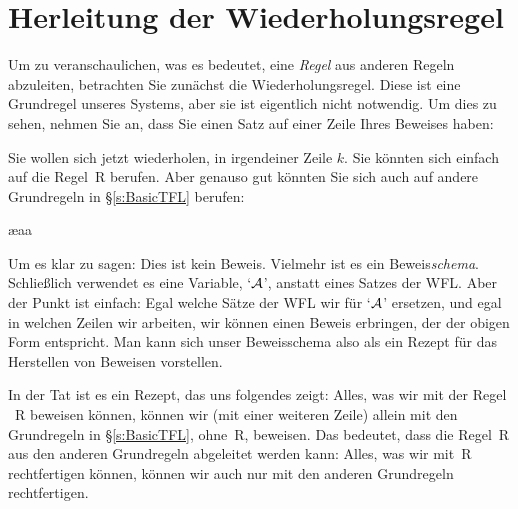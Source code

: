 \section{Herleitung der Wiederholungsregel}
Um zu veranschaulichen, was es bedeutet, eine \emph{Regel} aus anderen Regeln abzuleiten, betrachten Sie zunächst die Wiederholungsregel. Diese ist eine Grundregel unseres Systems, aber sie ist eigentlich nicht notwendig. Um dies zu sehen, nehmen Sie an, dass Sie einen Satz auf einer Zeile Ihres Beweises haben:
\begin{fitchproof}
\end{fitchproof}
Sie wollen sich jetzt wiederholen, in irgendeiner Zeile $k$. Sie könnten sich einfach auf die Regel~R berufen. Aber genauso gut könnten Sie sich auch auf andere Grundregeln in \S\ref{s:BasicTFL} berufen:
\begin{fitchproof}
	\ae{aa}
\end{fitchproof}
Um es klar zu sagen: Dies ist kein Beweis. Vielmehr ist es ein Beweis\emph{schema}. Schlie{\ss}lich verwendet es eine Variable, `$\mathcal{A}$', anstatt eines Satzes der WFL. Aber der Punkt ist einfach: Egal welche Sätze der WFL wir für `$\mathcal{A}$' ersetzen, und egal in welchen Zeilen wir arbeiten, wir können einen Beweis erbringen, der der obigen Form entspricht. Man kann sich unser Beweisschema also als ein Rezept für das Herstellen von Beweisen vorstellen. 

In der Tat ist es ein Rezept, das uns folgendes zeigt: Alles, was wir mit der Regel ~R beweisen können, können wir (mit einer weiteren Zeile) allein mit den Grundregeln in \S\ref{s:BasicTFL}, ohne~R, beweisen. Das bedeutet, dass die Regel~R aus den anderen Grundregeln abgeleitet werden kann: Alles, was wir mit~R rechtfertigen können, können wir auch nur mit den anderen Grundregeln rechtfertigen.

